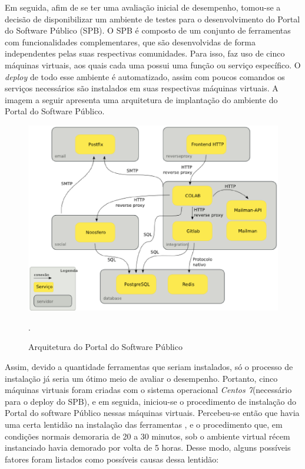 Em seguida, afim de se ter uma avaliação inicial de desempenho, tomou-se a decisão de disponibilizar um ambiente de testes para o desenvolvimento do Portal do Software Público (SPB). O SPB é composto de um conjunto de ferramentas com funcionalidades complementares, que são desenvolvidas de forma independentes pelas suas respectivas comunidades\cite{softwarepublico}. Para isso, faz uso de cinco máquinas virtuais, aos quais cada uma possui uma função ou serviço específico. O \textit{deploy} de todo esse ambiente é automatizado, assim com poucos comandos os serviços necessários são instalados em suas respectivas máquinas virtuais. A imagem a seguir apresenta uma arquitetura de implantação do ambiente do Portal do Software Público. 
\begin{figure}[!htb]
\centering
\includegraphics [keepaspectratio=true,scale=0.60]{figuras/arquiteturaSPB.eps}
\caption{Arquitetura do Portal do Software Público}
\cite{softwarepublico}.
\label{SPB}
\end{figure}

Assim, devido a quantidade ferramentas que seriam instalados, só o processo de instalação já seria um ótimo meio de avaliar o desempenho. Portanto, cinco máquinas virtuais foram criadas com o sistema operacional \textit{Centos 7}(necessário para o deploy do SPB), e em seguida, iniciou-se o procedimento de instalação do Portal do software Público nessas máquinas virtuais. Percebeu-se então que havia uma certa lentidão na instalação das ferramentas , e o procedimento que, em condições normais demoraria de 20 a 30 minutos, sob o ambiente virtual récem instanciado havia demorado por volta de 5 horas. Desse modo, alguns possíveis fatores foram listados como possíveis causas dessa lentidão:

